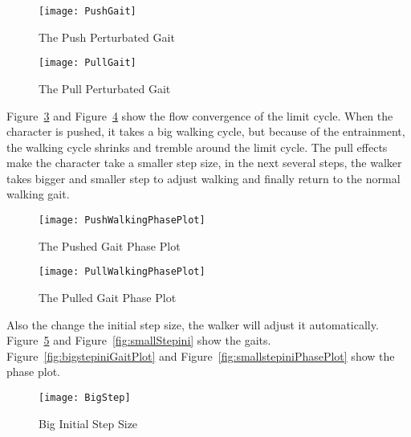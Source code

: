\begin{figure}[!htbp]
  \begin{center}
      \texttt{[image: PushGait]}
    \caption{The Push Perturbated Gait}
    \label{fig:PushGait}
\end{center}
\end{figure}


\begin{figure}[!htbp]
  \begin{center}
      \texttt{[image: PullGait]}
    \caption{The Pull Perturbated Gait}
    \label{fig:PullGait}
\end{center}
\end{figure}

Figure~\ref{fig:PushGaitPlot} and Figure~\ref{fig:PullGaitPhasePlot} show the flow convergence of the limit cycle.
When the character is pushed, it takes a big walking cycle, but because of the entrainment, the walking cycle shrinks and tremble around the limit cycle. The pull effects make the character take a smaller step size, in the next several steps, the walker takes bigger and smaller step to adjust walking and finally return to the normal walking gait.


\begin{figure}[!htbp]
  \begin{center}
      \texttt{[image: PushWalkingPhasePlot]}
    \caption{The Pushed Gait Phase Plot}
    \label{fig:PushGaitPlot}
\end{center}
\end{figure}


\begin{figure}[!htbp]
  \begin{center}
      \texttt{[image: PullWalkingPhasePlot]}
    \caption{The Pulled Gait Phase Plot}
    \label{fig:PullGaitPhasePlot}
\end{center}
\end{figure}


Also the change the initial step size, the walker will adjust it automatically.
Figure~\ref{fig:bigStepIni} and Figure~\ref{fig:smallStepini} show the gaits.
Figure~\ref{fig:bigstepiniGaitPlot} and Figure~\ref{fig:smallstepiniPhasePlot} show the phase plot.

\begin{figure}[!htbp]
  \begin{center}
      \texttt{[image: BigStep]}
    \caption{Big Initial Step Size}
    \label{fig:bigStepIni}
\end{center}
\end{figure}


